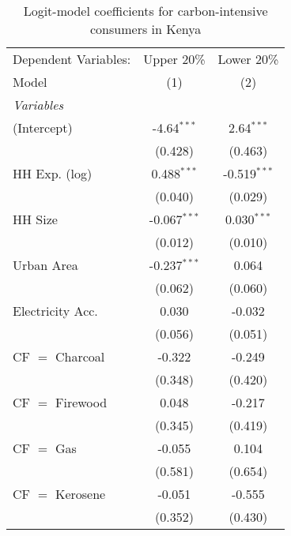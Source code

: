 
\begin{table}[htbp!]
   \centering
   \small
   \begin{adjustbox}{width = 1\textwidth, max height = 0.95\textheight, center}
      \begin{threeparttable}[b]
         \caption{\label{tab:Logit_1_KEN} Logit-model coefficients for carbon-intensive consumers in Kenya}
         \begin{tabular}{lcc}
            \tabularnewline \midrule \midrule
            Dependent Variables: & Upper 20\%     & Lower 20\%\\   
            Model                & (1)            & (2)\\  
            \midrule
            \emph{Variables}\\
            (Intercept)          & -4.64$^{***}$  & 2.64$^{***}$\\   
                                 & (0.428)        & (0.463)\\   
            HH Exp. (log)        & 0.488$^{***}$  & -0.519$^{***}$\\   
                                 & (0.040)        & (0.029)\\   
            HH Size              & -0.067$^{***}$ & 0.030$^{***}$\\   
                                 & (0.012)        & (0.010)\\   
            Urban Area           & -0.237$^{***}$ & 0.064\\   
                                 & (0.062)        & (0.060)\\   
            Electricity Acc.     & 0.030          & -0.032\\   
                                 & (0.056)        & (0.051)\\   
            CF $=$ Charcoal      & -0.322         & -0.249\\   
                                 & (0.348)        & (0.420)\\   
            CF $=$ Firewood      & 0.048          & -0.217\\   
                                 & (0.345)        & (0.419)\\   
            CF $=$ Gas           & -0.055         & 0.104\\   
                                 & (0.581)        & (0.654)\\   
            CF $=$ Kerosene      & -0.051         & -0.555\\   
                                 & (0.352)        & (0.430)\\   

\end{tabular}
\end{threeparttable}
\end{adjustbox}
\end{table}
